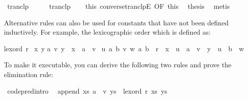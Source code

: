 \begin{isabellebody}
\isamarkupfalse%
\ tranclp\isanewline
{}\isamarkupfalse%
\ {\isacharminus}\isanewline
\ \ \isamarkupfalse%
\ tranclp\isanewline
\ \ \isamarkupfalse%
\ this\ converse{\isacharunderscore}tranclpE\ {\isacharbrackleft}OF\ this{\isacharparenleft}{}{\isacharparenright}{\isacharbrackright}\ \isamarkupfalse%
\ thesis\ \isamarkupfalse%
\ metis\isanewline
{}\isamarkupfalse%
%
\endisatagquote
{\isafoldquote}%
%
\isadelimquote
%
\endisadelimquote
%
\begin{isamarkuptext}%
\noindent Alternative rules can also be used for constants that have
  not been defined inductively. For example, the lexicographic order
  which is defined as:%
\end{isamarkuptext}%
\isamarkuptrue%
%
\isadelimquote
%
\endisadelimquote
%
\isatagquote
%
\begin{isamarkuptext}%
\begin{isabelle}%
lexord\ r\ {\isacharequal}\isanewline
{\isacharbraceleft}{\isacharparenleft}x{\isacharcomma}\ y{\isacharparenright}{\isachardot}\isanewline
\isaindent{\ }{\isasymexists}a\ v{\isachardot}\ y\ {\isacharequal}\ x\ {\isacharat}\ a\ {\isacharhash}\ v\ {\isasymor}\isanewline
{}u\ a\ b\ v\ w{\isachardot}\ {\isacharparenleft}a{\isacharcomma}\ b{\isacharparenright}\ {\isasymin}\ r\ {\isasymand}\ x\ {\isacharequal}\ u\ {\isacharat}\ a\ {\isacharhash}\ v\ {\isasymand}\ y\ {\isacharequal}\ u\ {\isacharat}\ b\ {\isacharhash}\ w{\isacharparenright}{\isacharbraceright}%
\end{isabelle}%
\end{isamarkuptext}%
\isamarkuptrue%
%
\endisatagquote
{\isafoldquote}%
%
\isadelimquote
%
\endisadelimquote
%
\begin{isamarkuptext}%
\noindent To make it executable, you can derive the following two
  rules and prove the elimination rule:%
\end{isamarkuptext}%
\isamarkuptrue%
%
\isadelimquote
%
\endisadelimquote
%
\isatagquote
{}\isamarkupfalse%
\ {\isacharbrackleft}code{\isacharunderscore}pred{\isacharunderscore}intro{\isacharbrackright}{\isacharcolon}\isanewline
\ \ {\isachardoublequoteopen}append\ xs\ {\isacharparenleft}a\ {\isacharhash}\ v{\isacharparenright}\ ys\ {\isasymLongrightarrow}\ lexord\ r\ {\isacharparenleft}xs{\isacharcomma}\ ys{\isacharparenright}{\isachardoublequoteclose}\isanewline

\end{isabellebody}
